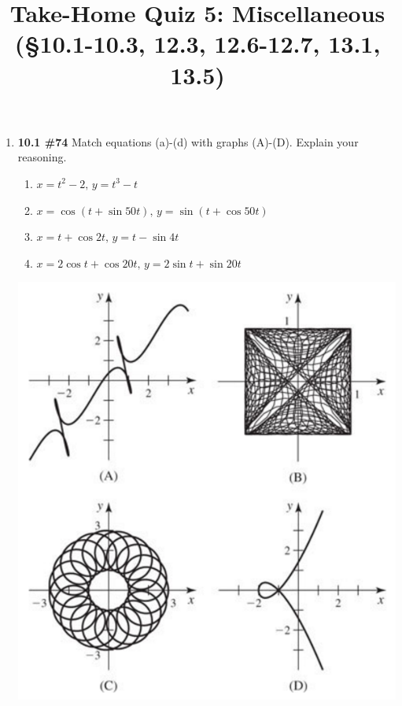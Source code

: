 \documentclass[%
]{article}
\title{\vspace{-3.5pc} 
	\flushleft \bf \Large Take-Home Quiz 5: Miscellaneous \\ (\S 10.1-10.3, 12.3, 12.6-12.7, 13.1, 13.5)}
\date{}
\begin{document}
\maketitle

\vspace{-3pc}

\noindent\hrulefill

\begin{enumerate}

\item {\bf 10.1 \#74}
Match equations (a)-(d) with graphs (A)-(D).  Explain your reasoning.
\begin{enumerate}
\item $x=t^2-2,\,y=t^3-t$
\item $x=\cos{(t+\sin{50t})},\,y=\sin{(t+\cos{50t})}$
\item $x=t+\cos{2t},\,y=t-\sin{4t}$
\item $x=2\cos t+\cos{20t},\,y=2\sin t+\sin{20t}$
\end{enumerate}

\begin{center}
\includegraphics[scale=0.75]{THQ510-1}
\end{center}


\end{enumerate}
\end{document}
